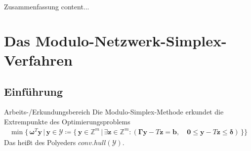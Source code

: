 \documentclass[accentcolor = tud11b, colorbacktitle, landscape, german, presentation, tudmathserif]{tudbeamer}
\newcommand{\R}{\ensuremath{\mathbb{R}}}
\newcommand{\Z}{\ensuremath{\mathbb{Z}}}
\newcommand{\mat}[1]{\boldsymbol{\mathbf{#1}}}
\renewcommand{\vec}[1]{\boldsymbol{\mathbf{#1}}}
\begin{document}
		
			\begin{frame}{Zusammenfassung}
				content...
			\end{frame}
	
	\section{Das Modulo-Netzwerk-Simplex-Verfahren}
		\subsection{Einführung}
			\begin{frame}{Arbeits-/Erkundungsbereich}
				Die Modulo-Simplex-Methode erkundet die Extrempunkte des Optimierungsproblems
				\begin{gather*}
					\min \Big\{\, \vec{\omega}^T \vec{y} \,\big\vert\, \vec{y} \in \mathcal{Y}\coloneqq \big\{\, \vec{y} \in \Z^m \,\vert\, \exists \vec{z} \in \Z^m : ( \mat{\Gamma} \vec{y} - T\vec{z} = \vec{b}, \quad \vec{0} \leq \vec{y} - T\vec{z} \leq \vec{\delta} ) \,\big\} \Big\}
				\end{gather*}
				Das heißt des Polyeders \( \mathit{conv.hull}(\mathcal{Y}) \).
			\end{frame}
		
\end{document}
